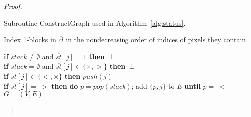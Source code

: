 \documentclass[11pt,english]{article}
\numberwithin{figure}{section}
\newcommand{\Constgr}{{\sf ConstructGraph}\xspace}
\begin{document}
\begin{proof}
\begin{algorithm}\label{alg:graph}
\caption{Subroutine \Constgr used in Algorithm~\ref{alg:status}.}
\DontPrintSemicolon
\BlankLine
\nl Index 1-blocks in $\overline{cl}$ in the nondecreasing order of indices of pixels they contain. \\

\nl {} {
\nl\textbf{if} $stack\neq\emptyset$ and $\overline{st}[j]=1$ \textbf{then} \Return $\perp$\\
\nl\textbf{if} $stack=\emptyset$ and $\overline{st}[j]\in\{\boldsymbol{\times},\boldsymbol{>}\}$ \textbf{then} \Return $\perp$\\

\nl\textbf{if} $\overline{st}[j]\in\{\boldsymbol{<},\boldsymbol{\times}\}$ \textbf{then} $push(j)$\\
\nl\textbf{if} $\overline{st}[j]=\ \boldsymbol{>}$ \textbf{then} \textbf{do} $p=pop(stack)$; add $\{p,j\}$ to $E$ \textbf{until} $p=\ \boldsymbol{<}$\\
}
\nl \Return $G=(V,E)$\\
\end{algorithm}




\end{proof}
\end{document}
